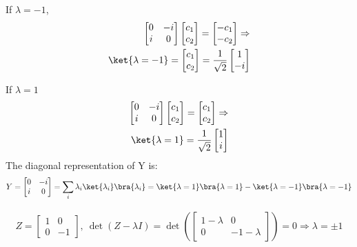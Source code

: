 \documentclass[a4paper,12pt]{article}
\begin{document}
If $\lambda = -1$,
\begin{align*}
	\begin{bmatrix}
		0 & -i \\
		i & 0
	\end{bmatrix}
	\begin{bmatrix}
		c_1 \\
		c_2
	\end{bmatrix} =
	\begin{bmatrix}
		-c_1 \\
		-c_2
	\end{bmatrix}
	\Rightarrow \\ \ket{\lambda = -1} = \begin{bmatrix}
	c_1 \\
	c_2
	\end{bmatrix} = \frac{1}{\sqrt{2}}
	\begin{bmatrix}
	1 \\
	-i
	\end{bmatrix}
\end{align*}

If $\lambda = 1$
\begin{align*}
        \begin{bmatrix}
		0 & -i \\
		i & 0
	\end{bmatrix}
	\begin{bmatrix}
		c_1 \\
		c_2
	\end{bmatrix} =
	\begin{bmatrix}
		c_1 \\
		c_2
	\end{bmatrix}
	\Rightarrow \\ \ket{\lambda = 1} = \frac{1}{\sqrt{2}}
	\begin{bmatrix}
	1 \\
	i
	\end{bmatrix}
\end{align*}
The diagonal representation of Y is:
\begin{align*}
	Y = \begin{bmatrix}
	0 & -i \\
	i & 0
	\end{bmatrix}
	= \sum_i \lambda_i \ket{\lambda_i}\bra{\lambda_i}= \ket{\lambda=1}\bra{\lambda=1}-\ket{\lambda=-1}\bra{\lambda=-1}
\end{align*}


\begin{align*}
	Z = \begin{bmatrix}
	1 & 0 \\
	0 & -1
	\end{bmatrix},\ \det(Z-\lambda I) =
	\det \left(\begin{bmatrix}
	1-\lambda & 0 \\
	0 & -1-\lambda
	\end{bmatrix} \right) = 0 \Rightarrow \lambda = \pm 1
\end{align*}
\end{document}
